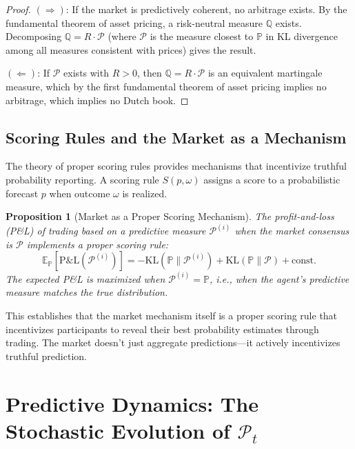 \documentclass[12pt,a4paper]{article}
\newtheorem{proposition}[theorem]{Proposition}
\theoremstyle{definition}
\newcommand{\E}{\mathbb{E}}
\newcommand{\Prob}{\mathbb{P}}
\newcommand{\Q}{\mathbb{Q}}
\newcommand{\PP}{\mathcal{P}}
\newcommand{\KL}{\mathrm{KL}}
\begin{document}
\begin{proof}
$(\Rightarrow)$: If the market is predictively coherent, no arbitrage exists. By the fundamental theorem of asset pricing, a risk-neutral measure $\Q$ exists. Decomposing $\Q = R \cdot \PP$ (where $\PP$ is the measure closest to $\Prob$ in KL divergence among all measures consistent with prices) gives the result.

$(\Leftarrow)$: If $\PP$ exists with $R > 0$, then $\Q = R \cdot \PP$ is an equivalent martingale measure, which by the first fundamental theorem of asset pricing implies no arbitrage, which implies no Dutch book.
\end{proof}

\subsection{Scoring Rules and the Market as a Mechanism}

The theory of proper scoring rules \citep{gneiting2007} provides mechanisms that incentivize truthful probability reporting. A scoring rule $S(p, \omega)$ assigns a score to a probabilistic forecast $p$ when outcome $\omega$ is realized.

\begin{proposition}[Market as a Proper Scoring Mechanism]\label{prop:scoring}
The profit-and-loss (P\&L) of trading based on a predictive measure $\PP^{(i)}$ when the market consensus is $\PP$ implements a proper scoring rule:
\begin{equation}\label{eq:market_scoring}
    \E_\Prob[\text{P\&L}(\PP^{(i)})] = -\KL(\Prob \| \PP^{(i)}) + \KL(\Prob \| \PP) + \text{const.}
\end{equation}
The expected P\&L is maximized when $\PP^{(i)} = \Prob$, i.e., when the agent's predictive measure matches the true distribution.
\end{proposition}

This establishes that the market mechanism itself is a proper scoring rule that incentivizes participants to reveal their best probability estimates through trading. The market doesn't just aggregate predictions---it actively incentivizes truthful prediction.



\section{Predictive Dynamics: The Stochastic Evolution of $\PP_t$}\label{sec:dynamics}
\end{document}
